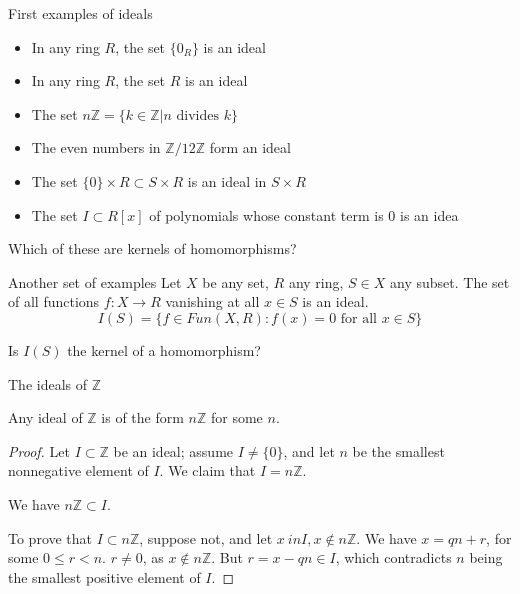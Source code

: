 \documentclass{beamer}
\begin{document}
\begin{frame}{First examples of ideals}

\begin{itemize}
\item In any ring $R$, the set $\{0_R\}$ is an ideal
\item In any ring $R$, the set $R$ is an ideal
\item The set $n\mathbb{Z}=\{k\in \mathbb{Z} | n \textrm{ divides } k \}$
\item The even numbers in $\mathbb{Z}/12\mathbb{Z}$ form an ideal
\item The set $\{0\}\times R\subset S\times R$ is an ideal in $S\times R$
\item The set $I\subset R[x]$ of polynomials whose constant term is 0 is an idea
\end{itemize}
\begin{block}{Which of these are kernels of homomorphisms?}
  \end{block}

\end{frame}

\begin{frame}{Another set of examples}
Let $X$ be any set, $R$ any ring, $S\in X$ any subset.  The set of all functions $f:X\to R$ vanishing at all $x\in S$ is an ideal.
$$I(S)=\{f\in Fun(X,R): f(x)=0 \text{ for all } x\in S\}$$

\begin{block}{Is $I(S)$ the kernel of a homomorphism?}
\end{block}

\end{frame}


\begin{frame}{The ideals of $\mathbb{Z}$}

\begin{lemma} Any ideal of $\mathbb{Z}$ is of the form $n\mathbb{Z}$ for some $n$.
\end{lemma}

\begin{proof}
Let $I\subset \mathbb{Z}$ be an ideal; assume $I\neq \{0\}$, and let $n$ be the smallest nonnegative element of $I$.  We claim that $I=n\mathbb{Z}$.

We have $n\mathbb{Z}\subset I$.  

To prove that $I\subset n\mathbb{Z}$, suppose not, and let $x\ in I, x\notin n\mathbb{Z}$.  We have $x=qn+r$, for some $0\leq r<n$.  $r\neq 0$, as $x\notin n\mathbb{Z}$.  But $r=x-qn\in I$, which contradicts $n$ being the smallest positive element of $I$.

\end{proof}
\end{frame}
\end{document}

